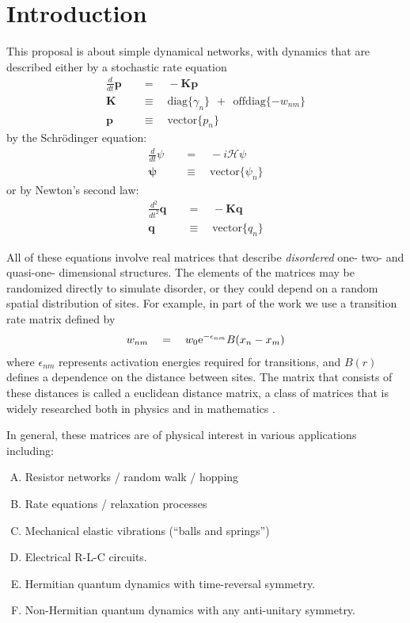 \chapter{Introduction}\label{sec:matrices}


This proposal is about simple dynamical networks, with dynamics
that are described either by a stochastic rate equation
%
\begin{align}
  \frac{d}{dt}\mathbf{p} \quad &= \quad -\mathbf{K} \mathbf{p} \\
  \mathbf{K} \quad &\equiv \quad \textrm{diag}\{ \gamma_n \} \ \ +\ \ \textrm{offdiag}\{ -w_{nm} \} \\
  \mathbf{p} \quad &\equiv \quad \textrm{vector}\{ p_n \}
\end{align}
%
by the Schr\"{o}dinger equation:
%
\begin{align}
  \frac{d}{dt}\psi \quad &= \quad -i \mathcal{H}\psi \\
  \mathbf{\psi} \quad &\equiv \quad \textrm{vector}\{ \psi_n \}
\end{align}
%
or by Newton's second law:
%
\begin{align}
  \frac{d^2}{dt^2}\mathbf{q} \quad &= \quad -\mathbf{K} \mathbf{q} \\
  \mathbf{q} \quad &\equiv \quad \textrm{vector}\{ q_n \}
\end{align}
%

All of these equations 
involve {\rm real} matrices that describe {\em disordered} 
one- two- and quasi-one- dimensional structures. The elements of
the matrices may be randomized directly to simulate disorder, or they
could depend on a random spatial distribution of sites. For example, in 
part of the work we use a transition rate matrix defined by
%
\begin{align}
w_{nm} \quad = \quad w_0 \mbox{e}^{-\epsilon_{nm}}B(x_n-x_m)
\end{align}
%
where $\epsilon_{nm}$ represents activation energies required for transitions,
and $B(r)$ defines a dependence on the distance between sites. The matrix
that consists of these distances is called a euclidean distance matrix, 
a class of matrices that is widely researched both in physics and in mathematics 
\cite{skipetrov_eigenvalue_2011, goetschy_non-hermitian_2011,mezard_spectra_1999, bogomolny_spectral_2003}.

In general, these matrices 
are of physical interest in various applications including:

\begin{enumerate}[A. ]
\item Resistor networks / random walk / hopping 
\item Rate equations / relaxation processes 
\item Mechanical elastic vibrations (``balls and springs'')
\item Electrical R-L-C circuits.
\item Hermitian quantum dynamics with time-reversal symmetry. 
\item Non-Hermitian quantum dynamics with any anti-unitary symmetry. 
\end{enumerate}

